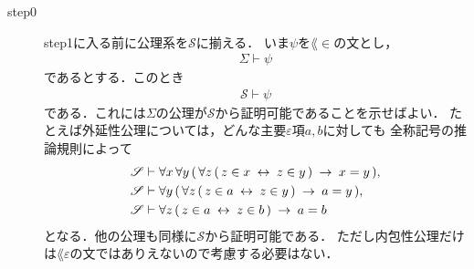 	\begin{description}
		\item[step0]
			step1に入る前に公理系を$\mathscr{S}$に揃える．
			いま$\psi$を$\lang{\in}$の文とし，
			\begin{align}
				\Sigma \vdash \psi
			\end{align}
			であるとする．このとき
			\begin{align}
				\mathscr{S} \vdash \psi
			\end{align}
			である．これには$\Sigma$の公理が$\mathscr{S}$から証明可能であることを示せばよい．
			たとえば外延性公理については，どんな主要$\varepsilon$項$a,b$に対しても
			全称記号の推論規則によって
			\begin{align}
				\mathscr{S} &\vdash \forall x\, \forall y\, (\, \forall z\, 
					(\, z \in x \hspace{0.25em}\leftrightarrow\hspace{0.25em} z \in y\, ) \hspace{0.25em}\rightarrow\hspace{0.25em} x = y\, ), \\
				\mathscr{S} &\vdash \forall y\, (\, \forall z\, 
					(\, z \in a \hspace{0.25em}\leftrightarrow\hspace{0.25em} z \in y\, ) \hspace{0.25em}\rightarrow\hspace{0.25em} a = y\, ), \\
				\mathscr{S} &\vdash \forall z\, 
					(\, z \in a \hspace{0.25em}\leftrightarrow\hspace{0.25em} z \in b\, ) \hspace{0.25em}\rightarrow\hspace{0.25em} a = b
			\end{align}
			となる．他の公理も同様に$\mathscr{S}$から証明可能である．
			ただし内包性公理だけは$\lang{\varepsilon}$の文ではありえないので考慮する必要はない．
			

\end{description}

